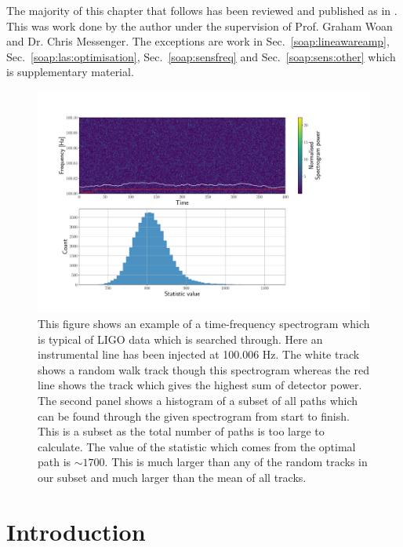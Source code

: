 The majority of this chapter that follows has been reviewed and published as in \citep{bayley2019GeneralizedApplication}. This was work done by the author under the supervision of Prof. Graham Woan and Dr. Chris Messenger.
The exceptions are work in Sec.~\ref{soap:lineawareamp}, Sec.~\ref{soap:las:optimisation}, Sec.~\ref{soap:sensfreq} and Sec.~\ref{soap:sens:other} which is supplementary material.


\begin{figure}

\centering
\includegraphics[width=\linewidth]{C3_soap/soap_spect_motivation.pdf}
\caption[Example of frequency tracks through a spectrogram and their summed power.]{This figure shows an example of a time-frequency spectrogram which is typical of \gls{LIGO} data which is searched through. Here an instrumental line has been injected at 100.006 Hz. The white track shows a random walk track though this spectrogram whereas the red line shows the track which gives the highest sum of detector power. The second panel shows a histogram of a subset of all paths which can be found through the given spectrogram from start to finish. This is a subset as the total number of paths is too large to calculate. The value of the statistic which comes from the optimal path is $\sim1700$. This is much larger than any of the random tracks in our subset and much larger than the mean of all tracks. }
\label{soap:motivation:plot}

\end{figure}

\section{Introduction}

